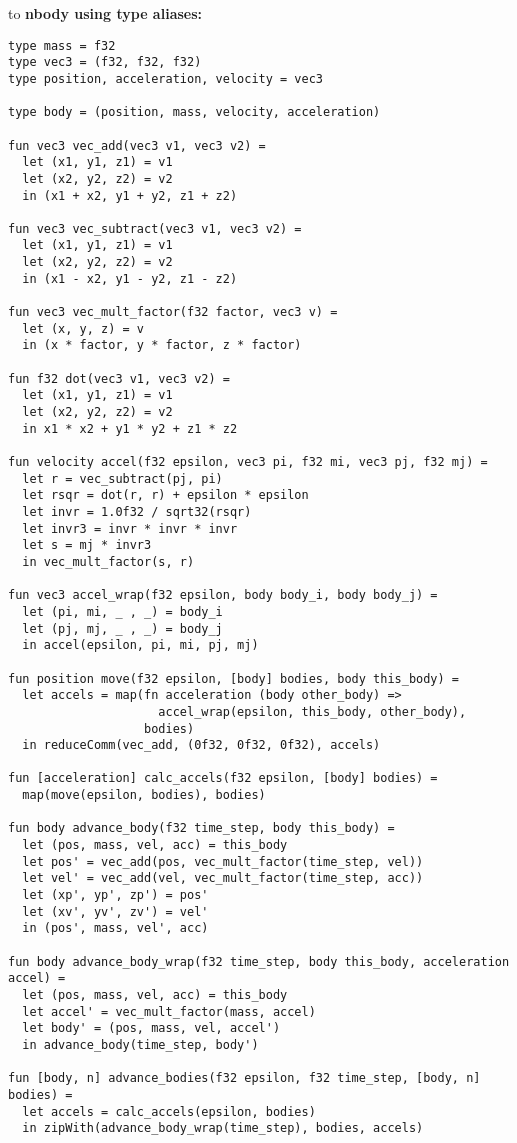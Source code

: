 to
\clearpage
\noindent \textbf{nbody using type aliases:}
\begin{lstlisting}
type mass = f32
type vec3 = (f32, f32, f32)
type position, acceleration, velocity = vec3

type body = (position, mass, velocity, acceleration)

fun vec3 vec_add(vec3 v1, vec3 v2) =
  let (x1, y1, z1) = v1
  let (x2, y2, z2) = v2
  in (x1 + x2, y1 + y2, z1 + z2)

fun vec3 vec_subtract(vec3 v1, vec3 v2) =
  let (x1, y1, z1) = v1
  let (x2, y2, z2) = v2
  in (x1 - x2, y1 - y2, z1 - z2)

fun vec3 vec_mult_factor(f32 factor, vec3 v) =
  let (x, y, z) = v
  in (x * factor, y * factor, z * factor)

fun f32 dot(vec3 v1, vec3 v2) =
  let (x1, y1, z1) = v1
  let (x2, y2, z2) = v2
  in x1 * x2 + y1 * y2 + z1 * z2

fun velocity accel(f32 epsilon, vec3 pi, f32 mi, vec3 pj, f32 mj) =
  let r = vec_subtract(pj, pi)
  let rsqr = dot(r, r) + epsilon * epsilon
  let invr = 1.0f32 / sqrt32(rsqr)
  let invr3 = invr * invr * invr
  let s = mj * invr3
  in vec_mult_factor(s, r)

fun vec3 accel_wrap(f32 epsilon, body body_i, body body_j) =
  let (pi, mi, _ , _) = body_i
  let (pj, mj, _ , _) = body_j
  in accel(epsilon, pi, mi, pj, mj)

fun position move(f32 epsilon, [body] bodies, body this_body) =
  let accels = map(fn acceleration (body other_body) =>
                     accel_wrap(epsilon, this_body, other_body),
                   bodies)
  in reduceComm(vec_add, (0f32, 0f32, 0f32), accels)

fun [acceleration] calc_accels(f32 epsilon, [body] bodies) =
  map(move(epsilon, bodies), bodies)

fun body advance_body(f32 time_step, body this_body) =
  let (pos, mass, vel, acc) = this_body
  let pos' = vec_add(pos, vec_mult_factor(time_step, vel))
  let vel' = vec_add(vel, vec_mult_factor(time_step, acc))
  let (xp', yp', zp') = pos'
  let (xv', yv', zv') = vel'
  in (pos', mass, vel', acc)

fun body advance_body_wrap(f32 time_step, body this_body, acceleration accel) =
  let (pos, mass, vel, acc) = this_body
  let accel' = vec_mult_factor(mass, accel)
  let body' = (pos, mass, vel, accel')
  in advance_body(time_step, body')

fun [body, n] advance_bodies(f32 epsilon, f32 time_step, [body, n] bodies) =
  let accels = calc_accels(epsilon, bodies)
  in zipWith(advance_body_wrap(time_step), bodies, accels)


\end{lstlisting}
